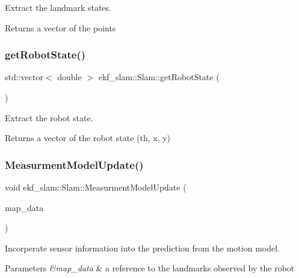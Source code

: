 Extract the landmark states. 

\begin{DoxyReturn}{Returns}
a vector of the points 
\end{DoxyReturn}
\mbox{\label{classekf__slam_1_1Slam_a8c218402ba9d30177c6740d001430cac}} 
\subsubsection{\texorpdfstring{get\+Robot\+State()}{getRobotState()}}
{\footnotesize\ttfamily std\+::vector$<$ double $>$ ekf\+\_\+slam\+::\+Slam\+::get\+Robot\+State (\begin{DoxyParamCaption}{ }\end{DoxyParamCaption})}



Extract the robot state. 

\begin{DoxyReturn}{Returns}
a vector of the robot state (th, x, y) 
\end{DoxyReturn}
\mbox{\label{classekf__slam_1_1Slam_ae95105bbeeea067f5dc09e44e594dd3e}} 
\subsubsection{\texorpdfstring{Measurment\+Model\+Update()}{MeasurmentModelUpdate()}}
{\footnotesize\ttfamily void ekf\+\_\+slam\+::\+Slam\+::\+Measurment\+Model\+Update (\begin{DoxyParamCaption}\item[{nuslam\+::\+Turtle\+Map}]{map\+\_\+data }\end{DoxyParamCaption})}



Incorperate sensor information into the prediction from the motion model. 


\begin{DoxyParams}{Parameters}
{\em \&map\+\_\+data} & a reference to the landmarks observed by the robot \\
\hline
\end{DoxyParams}
\mbox{\label{classekf__slam_1_1Slam_ab26e0c13cbaaa3bce75be953f8c3b39d}} 
